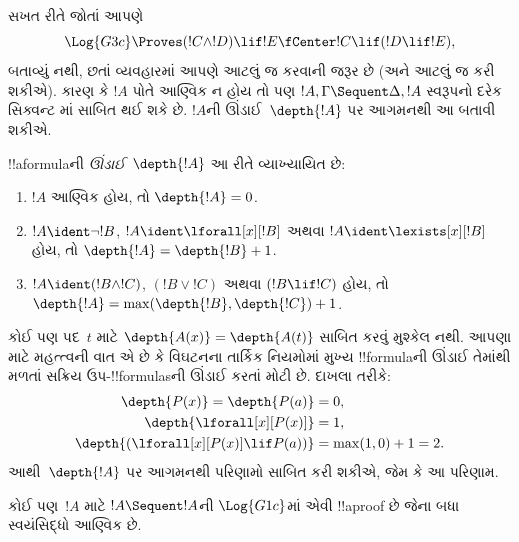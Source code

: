 \documentclass[../../../include/open-logic-section]{subfiles}
\begin{document}
સખત રીતે જોતાં આપણે
\[\Log{G3c} \Proves (!C \land !D) \lif !E \fCenter !C \lif (!D \lif
!E),\]
બતાવ્યું નથી, છતાં વ્યવહારમાં આપણે આટલું જ કરવાની
જરૂર છે (અને આટલું જ કરી શકીએ).
કારણ કે $!A$ પોતે આણ્વિક ન હોય તો પણ
$!A, \Gamma \Sequent \Delta, !A$ સ્વરૂપનો દરેક સિક્વન્ટ
માં સાબિત થઈ શકે છે.
$!A$ની ઊંડાઈ~$\depth{!A}$ પર આગમનથી આ બતાવી શકીએ.

\begin{defn}
!!a{formula}ની \emph{ઊંડાઈ}~$\depth{!A}$ આ રીતે વ્યાખ્યાયિત છે:
\begin{enumerate}
  \item $!A$ આણ્વિક હોય, તો $\depth{!A} = 0$.
  \item $!A \ident \lnot !B$, $!A \ident \lforall[x][!B]$
  અથવા $!A \ident \lexists[x][!B]$ હોય,
  તો $\depth{!A} = \depth{!B} + 1$.
  \item $!A \ident (!B \land !C)$, $(!B \lor !C)$
  અથવા $(!B \lif !C)$ હોય,
  તો $\depth{!A} = \max(\depth{!B},\depth{!C}) + 1$.
\end{enumerate}
\end{defn}

કોઈ પણ પદ~$t$ માટે $\depth{A(x)} = \depth{A(t)}$
સાબિત કરવું મુશ્કેલ નથી.
આપણા માટે મહત્ત્વની વાત એ છે કે વિઘટનના તાર્કિક નિયમોમાં
મુખ્ય !!{formula}ની ઊંડાઈ તેમાંથી મળતાં સક્રિય
ઉપ-!!{formula}sની ઊંડાઈ કરતાં મોટી છે.
દાખલા તરીકે:
\begin{align*}
\depth{P(x)} = \depth{P(a)} & = 0,\\
\depth{\lforall[x][P(x)]} & = 1,\\
\depth{(\lforall[x][P(x)] \lif P(a))} & = \max(1,0) + 1 = 2.
\end{align*}
આથી~$\depth{!A}$ પર આગમનથી પરિણામો સાબિત કરી શકીએ,
જેમ કે આ પરિણામ.

\begin{prop}
કોઈ પણ~$!A$ માટે $!A \Sequent !A$ની $ \Log{G1c}$માં
એવી !!a{proof} છે જેના બધા સ્વયંસિદ્ધો આણ્વિક છે.
\end{prop}
\end{document}
